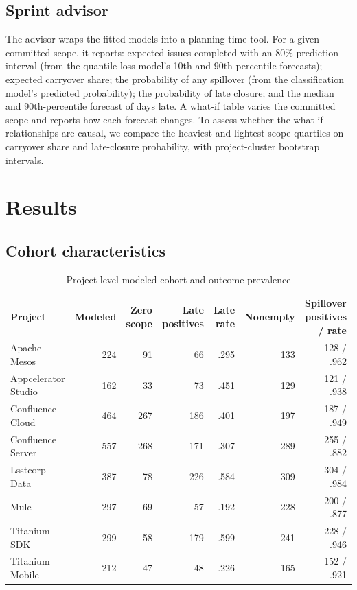 \documentclass[conference]{IEEEtran}
\begin{document}
\subsection{Sprint advisor}
The advisor wraps the fitted models into a planning-time tool.
For a given committed scope, it reports: expected issues completed with an 80\% prediction interval (from the quantile-loss model's 10th and 90th percentile forecasts); expected carryover share; the probability of any spillover (from the classification model's predicted probability); the probability of late closure; and the median and 90th-percentile forecast of days late.
A what-if table varies the committed scope and reports how each forecast changes.
To assess whether the what-if relationships are causal, we compare the heaviest and lightest scope quartiles on carryover share and late-closure probability, with project-cluster bootstrap intervals.

\section{Results}

\subsection{Cohort characteristics}

\begin{table}[t]
\centering\scriptsize
\caption{Project-level modeled cohort and outcome prevalence}
\label{tab:projectprev}
\setlength{\tabcolsep}{3.4pt}
\begin{tabular}{@{}lrrrrrr@{}}
\toprule
Project & Modeled & Zero scope & Late positives & Late rate & Nonempty & Spillover positives / rate\\
\midrule
Apache Mesos & 224 & 91 & 66 & .295 & 133 & 128 / .962\\
Appcelerator Studio & 162 & 33 & 73 & .451 & 129 & 121 / .938\\
Confluence Cloud & 464 & 267 & 186 & .401 & 197 & 187 / .949\\
Confluence Server & 557 & 268 & 171 & .307 & 289 & 255 / .882\\
Lsstcorp Data & 387 & 78 & 226 & .584 & 309 & 304 / .984\\
Mule & 297 & 69 & 57 & .192 & 228 & 200 / .877\\
Titanium SDK & 299 & 58 & 179 & .599 & 241 & 228 / .946\\
Titanium Mobile & 212 & 47 & 48 & .226 & 165 & 152 / .921\\
\bottomrule
\end{tabular}
\end{table}
\end{document}
